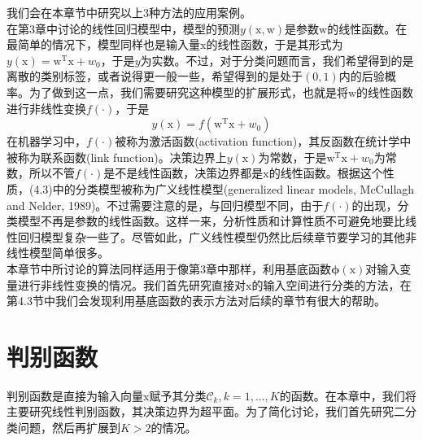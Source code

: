 \documentclass[b5paper]{book}
\numberwithin{equation}{chapter}
\newcommand {\bx} {\boldsymbol{\mathrm{x}}}
\newcommand {\bw} {\boldsymbol{\mathrm{w}}}
\newcommand {\rmT} {\mathrm{T}}
\newcommand {\bfphi} {\boldsymbol{\phi}}
\newcommand {\insertline} {\noindent{\color{red} \rule[5pt]{\textwidth}{0.1em}}}
\begin{document}
{	我们会在本章节中研究以上3种方法的应用案例。\\
	\indent 在第3章中讨论的线性回归模型中，模型的预测$y(\bx,\bw)$是参数$\bw$的线性函数。在最简单的情况下，模型同样也是输入量$\bx$的线性函数，于是其形式为$y(\bx)=\bw^{\rmT}\bx + w_0$，于是$y$为实数。不过，对于分类问题而言，我们希望得到的是离散的类别标签，或者说得更一般一些，希望得到的是处于$(0,1)$内的后验概率。为了做到这一点，我们需要研究这种模型的扩展形式，也就是将$\bw$的线性函数进行非线性变换$f(\cdot)$，于是
	\begin{equation}
		y(\bx) = f(\bw^{\rmT}\bx + w_0)
	\end{equation}
	在机器学习中，$f(\cdot)$被称为激活函数(activation function)，其反函数在统计学中被称为联系函数(link function)。决策边界上$y(\bx)$为常数，于是$\bw^{\rmT}\bx + w_0$为常数，所以不管$f(\cdot)$是不是线性函数，决策边界都是$\bx$的线性函数。根据这个性质，(4.3)中的分类模型被称为广义线性模型(generalized linear models, McCullagh and Nelder, 1989)。不过需要注意的是，与回归模型不同，由于$f(\cdot)$的出现，分类模型不再是参数的线性函数。这样一来，分析性质和计算性质不可避免地要比线性回归模型复杂一些了。尽管如此，广义线性模型仍然比后续章节要学习的其他非线性模型简单很多。\\
	\indent 本章节中所讨论的算法同样适用于像第3章中那样，利用基底函数$\bfphi(\bx)$对输入变量进行非线性变换的情况。我们首先研究直接对$\bx$的输入空间进行分类的方法，在第4.3节中我们会发现利用基底函数的表示方法对后续的章节有很大的帮助。
	}
	\section{判别函数}
	\insertline
	\textnormal{
	\indent 判别函数是直接为输入向量$\bx$赋予其分类$\mathcal{C}_k, k=1,...,K$的函数。在本章中，我们将主要研究线性判别函数，其决策边界为超平面。为了简化讨论，我们首先研究二分类问题，然后再扩展到$K>2$的情况。
	}
\end{document}
